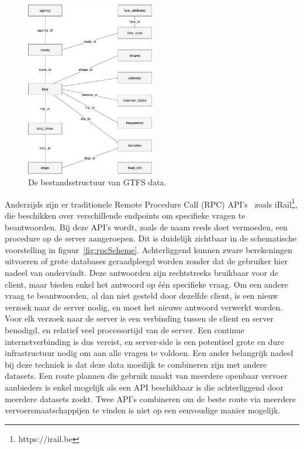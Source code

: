 \begin{figure}
	\centering
	\includegraphics[width=0.5\textwidth]{images/GTFS_scheme.pdf}
		\caption[GTFS structuur]{De bestandsstructuur van GTFS data.}
	\label{fig:gtfsScheme}
\end{figure}
 
Anderzijds zijn er traditionele Remote Procedure Call (RPC) API's~\citep{Nelson81} zoals iRail\footnote{https://irail.be}, die beschikken over verschillende endpoints om specifieke vragen te beantwoorden. Bij deze API's wordt, zoals de naam reeds doet vermoeden, een procedure op de server aangeroepen. Dit is duidelijk zichtbaar in de schematische voorstelling in figuur~\ref{fig:rpcScheme}. Achterliggend kunnen zware berekeningen uitvoeren of grote databases geraadpleegd worden zonder dat de gebruiker hier nadeel van ondervindt. Deze antwoorden zijn rechtstreeks bruikbaar voor de client, maar bieden enkel het antwoord op één specifieke vraag. Om een andere vraag te beantwoorden, al dan niet gesteld door dezelfde client, is een nieuw verzoek naar de server nodig, en moet het nieuwe antwoord verwerkt worden. Voor elk verzoek naar de server is een verbinding tussen de client en server benodigd, en relatief veel processortijd van de server. Een continue internetverbinding is dus vereist, en server-side is een potentieel grote en dure infrastructuur nodig om aan alle vragen te voldoen. Een ander belangrijk nadeel bij deze techniek is dat deze data moeilijk te combineren zijn met andere datasets. Een route plannen die gebruik maakt van meerdere openbaar vervoer aanbieders is enkel mogelijk als een API beschikbaar is die achterliggend door meerdere datasets zoekt. Twee API's combineren om de beste route via meerdere vervoersmaatschappijen te vinden is niet op een eenvoudige manier mogelijk.

